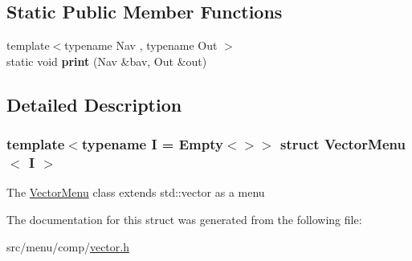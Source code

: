 \subsection*{Static Public Member Functions}
\begin{DoxyCompactItemize}
\item 
\mbox{\label{structVectorMenu_a6afd504bebb9fc0196133d541f2c0192}} 
{\footnotesize template$<$typename Nav , typename Out $>$ }\\static void {\bfseries print} (Nav \&bav, Out \&out)
\end{DoxyCompactItemize}


\subsection{Detailed Description}
\subsubsection*{template$<$typename I = Empty$<$$>$$>$\newline
struct Vector\+Menu$<$ I $>$}

The \hyperlink{structVectorMenu}{Vector\+Menu} class extends std\+::vector as a menu 

The documentation for this struct was generated from the following file\+:\begin{DoxyCompactItemize}
\item 
src/menu/comp/\hyperlink{vector_8h}{vector.\+h}\end{DoxyCompactItemize}
